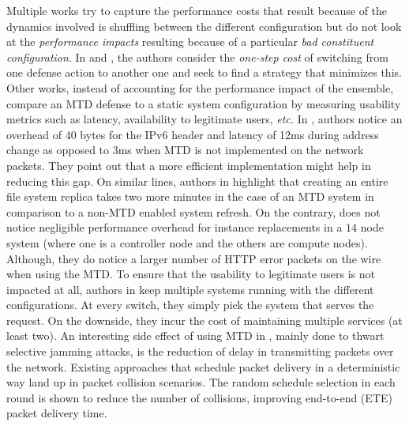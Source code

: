 Multiple works try to capture the performance costs that result because of the dynamics involved is shuffling between the different configuration but do not look at the  \emph{performance impacts} resulting because of a particular \emph{bad constituent configuration}. In  and , the authors consider the \emph{one-step cost} of switching from one defense action to another one and seek to find a strategy that minimizes this. 
Other works, instead of accounting for the performance impact of the ensemble, compare an MTD defense to a static system configuration by measuring usability metrics such as latency, availability to legitimate users, {\em etc.} In , authors notice an overhead of 40 bytes for the IPv6 header and latency of 12ms during address change as opposed to 3ms when MTD is not implemented on the network packets. They point out that a more efficient implementation might help in reducing this gap. On similar lines, authors in  highlight that creating an entire file system replica takes two more minutes in the case of an MTD system in comparison to a non-MTD enabled system refresh. On the contrary,  does not notice negligible performance overhead for instance replacements in a $14$ node system (where one is a controller node and the others are compute nodes). Although, they do notice a larger number of {HTTP error packets} on the wire when using the MTD. To ensure that the usability to legitimate users is not impacted at all, authors in  keep multiple systems running with the different configurations. At every switch, they simply pick the system that serves the request. On the downside, they incur the cost of maintaining multiple services (at least two). An interesting side effect of using MTD in , mainly done to thwart selective jamming attacks, is the reduction of delay in transmitting packets over the network. Existing approaches that schedule packet delivery in a deterministic way land up in packet collision scenarios. The random schedule selection in each round is shown to reduce the number of collisions, improving end-to-end (ETE) packet delivery time.


